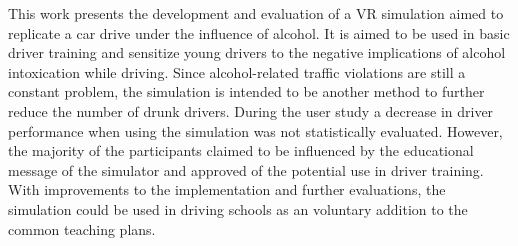 This work presents the development and evaluation of a VR simulation aimed to replicate a car drive under the influence of alcohol.
It is aimed to be used in basic driver training and sensitize young drivers to the negative implications of alcohol intoxication while driving.
Since alcohol-related traffic violations are still a constant problem, the simulation is intended to be another method to further reduce the number of drunk drivers.
During the user study a decrease in driver performance when using the simulation was not statistically evaluated.
However, the majority of the participants claimed to be influenced by the educational message of the simulator and approved of the potential use in driver training.
With improvements to the implementation and further evaluations, the simulation could be used in driving schools as an voluntary addition to the common teaching plans. 
